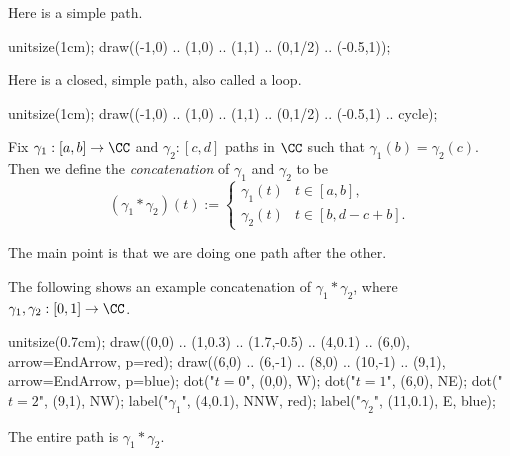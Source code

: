 \begin{example}
	Here is a simple path.
	\begin{center}
		\begin{asy}
			unitsize(1cm);
			draw((-1,0) .. (1,0) .. (1,1) .. (0,1/2) .. (-0.5,1));
		\end{asy}
	\end{center}
\end{example}
\begin{example}
	Here is a closed, simple path, also called a loop.
	\begin{center}
		\begin{asy}
			unitsize(1cm);
			draw((-1,0) .. (1,0) .. (1,1) .. (0,1/2) .. (-0.5,1) .. cycle);
		\end{asy}
	\end{center}
\end{example}
\begin{definition}[Concatenation]
	Fix $\gamma_1:[a,b]\to\CC$ and $\gamma_2:[c,d]$ paths in $\CC$ such that $\gamma_1(b)=\gamma_2(c)$. Then we define the \textit{concatenation} of $\gamma_1$ and $\gamma_2$ to be
	\[(\gamma_1*\gamma_2)(t):=\begin{cases}
		\gamma_1(t) & t\in[a,b], \\
		\gamma_2(t) & t\in[b,d-c+b].
	\end{cases}\]
\end{definition}
The main point is that we are doing one path after the other.
\begin{example}
	The following shows an example concatenation of $\gamma_1*\gamma_2$, where $\gamma_1,\gamma_2:[0,1]\to\CC$.
	\begin{center}
		\begin{asy}
			unitsize(0.7cm);
			draw((0,0) .. (1,0.3) .. (1.7,-0.5) .. (4,0.1) .. (6,0), arrow=EndArrow, p=red);
			draw((6,0) .. (6,-1) .. (8,0) .. (10,-1) .. (9,1), arrow=EndArrow, p=blue);
			dot("$t=0$", (0,0), W);
			dot("$t=1$", (6,0), NE);
			dot("$t=2$", (9,1), NW);
			label("$\gamma_1$", (4,0.1), NNW, red);
			label("$\gamma_2$", (11,0.1), E, blue);
		\end{asy}
	\end{center}
	The entire path is $\gamma_1*\gamma_2$.
\end{example}

